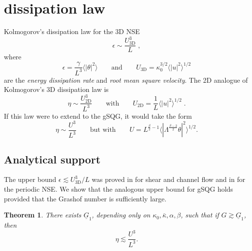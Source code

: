 \documentclass[twoside, reqno]{amsart}
\numberwithin{lemma}{section}
\newtheorem{theorem}{Theorem}
\numberwithin{theorem}{section}
\numberwithin{proposition}{section}
\numberwithin{equation}{section} %
\newcommand{\te}{\theta}
\newcommand{\la}{\Lambda}
\newcommand{\ka}{\kappa}
\newcommand{\bkap}{\bar{\kap}}
\newcommand{\Gb}{\underline{G}}
\newcommand{\al}{\alpha}
\newcommand{\be}{\beta}
\newcommand{\kap}{\kappa}
\newcommand{\vm}[1]{\textcolor{olive}{\textsf{[COMMENT FROM VINCENT: #1]}}}
\begin{document}
\section{dissipation law}
Kolmogorov's dissipation law for the 3D NSE
    \begin{equation} \label{rel:etau_3DNSE}
        \epsilon \sim \frac{U_{\text{3D}}^3}{L}\;,
    \end{equation}
where 
$$\epsilon=\frac{\gamma}{L^3}\langle |\theta|^2\rangle\qquad \text{and} \qquad U_{\text{3D}}=\ka_0^{3/2} \langle |u|^2 \rangle^{1/2}$$
are the {\it energy dissipation rate} and {\it root mean square velocity}.  The 2D analogue of Kolmogorov's 3D dissipation law is
    \begin{equation} \label{rel:etau_NSE}
        \eta \sim \frac{U_{\text{2D}}^3}{L^3}\qquad \text{with} \qquad U_{\text{2D}}={\frac{1}{L}}
        \langle |u|^2 \rangle^{1/2}\;.
    \end{equation}
If this law were to extend to the gSQG, it would take the form 
    \begin{equation} \label{disslawgSQG}
    \eta \sim \frac{U^3}{L^3}\qquad \text{but with} \qquad     U ={L^{\frac{\be}2-1}}
    \langle|\la^{\frac{\beta-2}{2}}\te|^2\rangle^{1/2} .
    \end{equation}


  
 \subsection{Analytical support}\label{rigdisslaw}
   
 The upper bound  $\epsilon \lesssim {U_{\text{3D}}^3}/{L}$ was proved in \cite{constantin1994shear} for shear and channel flow and in \cite{foias1997turbulence} for the periodic NSE.  {We show that the} analogous upper bound for gSQG holds provided that the Grashof number is sufficiently large. 
\begin{theorem} \label{thm:etau}
 There exists $\Gb_1$, depending only on $\kap_0,\bkap,\al,\be$, such that if $ G \gtrsim \Gb_1 $, then
    \begin{equation} \label{rel:etau_gSQG}
        \eta \lesssim \frac{U^3}{L^3}.
    \end{equation}    
    \end{theorem}

\end{document}
